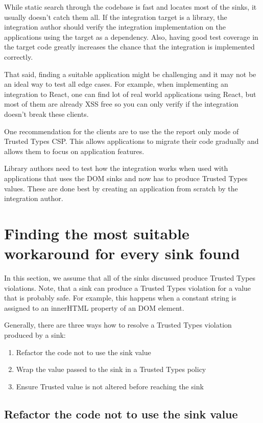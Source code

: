 While static search through the codebase is fast and locates most of the sinks, it usually doesn't
catch them all. If the integration target is a library, the integration author should verify the
integration implementation on the applications using the target as a dependency. Also, having good
test coverage in the target code greatly increases the chance that the integration is
implemented correctly.

That said, finding a suitable application might be challenging and it may not be an ideal way to
test all edge cases. For example, when implementing an integration to React, one can find lot of
real world applications using React, but most of them are already XSS free so you can only verify if
the integration doesn't break these clients.

One recommendation for the clients are to use the the report only mode of Trusted Types CSP. This
allows applications to migrate their code gradually and allows them to focus on application
features.

Library authors need to test how the integration works when used with applications that uses the
DOM sinks and now has to produce Trusted Types values. These are done best by creating an
application from scratch by the integration author.

\section{Finding the most suitable workaround for every sink found}

In this section, we assume that all of the sinks discussed produce Trusted Types violations. Note,
that a sink can produce a Trusted Types violation for a value that is probably safe. For example, this happens
when a constant string is assigned to an innerHTML property of an DOM element.

Generally, there are three ways how to resolve a Trusted Types violation produced by a sink:

\begin{enumerate}
  \item Refactor the code not to use the sink value
  \item Wrap the value passed to the sink in a Trusted Types policy
  \item Ensure Trusted value is not altered before reaching the sink
\end{enumerate}

\subsection{Refactor the code not to use the sink value}

